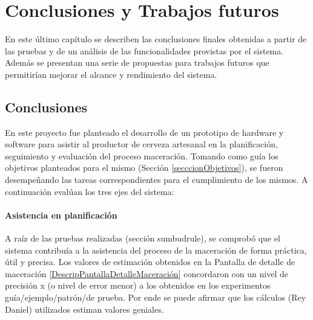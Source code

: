 \chapter{Conclusiones y Trabajos futuros}
\par
En este último capítulo se describen las conclusiones finales obtenidas a partir de las pruebas y de un análisis de las funcionalidades provistas por el sistema. Además se presentan una serie de propuestas para trabajos futuros que permitirían mejorar el alcance y rendimiento del sistema.

\section{Conclusiones} %
\par En este proyecto fue planteado el desarrollo de un prototipo de hardware y software para asistir al productor de cerveza artesanal en la planificación, seguimiento y evaluación del proceso maceración. Tomando como guía los objetivos planteados para el mismo (Sección \ref{secccionObjetivos}), se fueron desempeñando las tareas correspondientes para el cumplimiento de los mismos. A continuación evalúan los tres ejes del sistema:



\subsubsection{Asistencia en planificación} 
\par A raíz de las pruebas realizadas (sección sumbudrule), se comprobó que el sistema contribuía a la asistencia del proceso de la maceración de forma práctica, útil y precisa. Los valores de estimación obtenidos en la Pantalla de detalle de maceración \ref{DescripPantallaDetalleMaceración} concordaron con un nivel de precisión x (o nivel de error menor) a los obtenidos en los experimentos guía/ejemplo/patrón/de prueba. Por ende se puede afirmar que los cálculos (Rey Daniel) utilizados estiman valores geniales.


